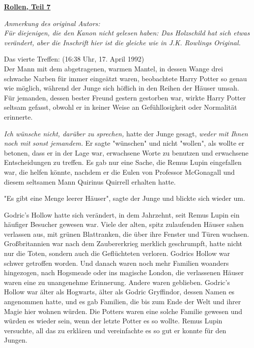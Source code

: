 

\hypertarget{rollen-teil-7}{%

\textbf{\uline{Rollen, Teil 7}}

\emph{Anmerkung des original Autors:}\\ \emph{Für diejenigen, die den Kanon nicht gelesen haben: Das Holzschild hat sich etwas verändert, aber die Inschrift hier ist die gleiche wie in J.K. Rowlings Original.}

Das vierte Treffen: (16:38 Uhr, 17. April 1992)\\ Der Mann mit dem abgetragenen, warmen Mantel, in dessen Wange drei schwache Narben für immer eingeätzt waren, beobachtete Harry Potter so genau wie möglich, während der Junge sich höflich in den Reihen der Häuser umsah. Für jemanden, dessen bester Freund gestern gestorben war, wirkte Harry Potter seltsam gefasst, obwohl er in keiner Weise an Gefühllosigkeit oder Normalität erinnerte.

\emph{Ich wünsche nicht, darüber zu sprechen,} hatte der Junge gesagt, \emph{weder mit Ihnen noch mit sonst jemandem.} Er sagte "wünschen" und nicht "wollen", als wollte er betonen, dass er in der Lage war, erwachsene Worte zu benutzen und erwachsene Entscheidungen zu treffen. Es gab nur eine Sache, die Remus Lupin eingefallen war, die helfen könnte, nachdem er die Eulen von Professor McGonagall und diesem seltsamen Mann Quirinus Quirrell erhalten hatte.

"Es gibt eine Menge leerer Häuser", sagte der Junge und blickte sich wieder um.

Godric's Hollow hatte sich verändert, in dem Jahrzehnt, seit Remus Lupin ein häufiger Besucher gewesen war. Viele der alten, spitz zulaufenden Häuser sahen verlassen aus, mit grünen Blattranken, die über ihre Fenster und Türen wuchsen. Großbritannien war nach dem Zaubererkrieg merklich geschrumpft, hatte nicht nur die Toten, sondern auch die Geflüchteten verloren. Godrics Hollow war schwer getroffen worden. Und danach waren noch mehr Familien woanders hingezogen, nach Hogsmeade oder ins magische London, die verlassenen Häuser waren eine zu unangenehme Erinnerung. Andere waren geblieben. Godric's Hollow war älter als Hogwarts, älter als Godric Gryffindor, dessen Namen es angenommen hatte, und es gab Familien, die bis zum Ende der Welt und ihrer Magie hier wohnen würden. Die Potters waren eine solche Familie gewesen und würden es wieder sein, wenn der letzte Potter es so wollte. Remus Lupin versuchte, all das zu erklären und vereinfachte es so gut er konnte für den Jungen.

}
